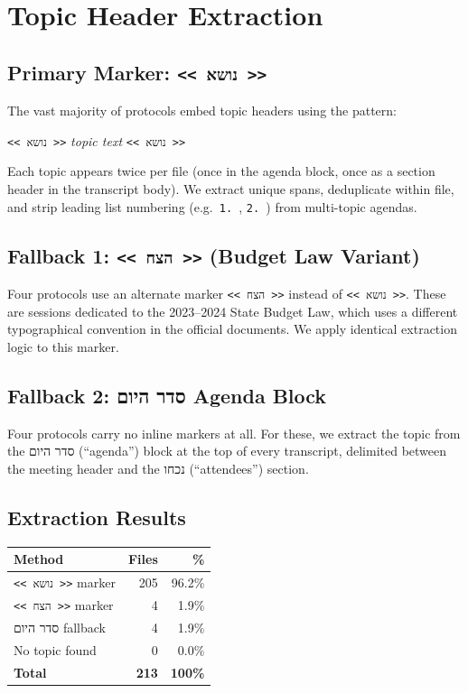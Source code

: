 \documentclass[11pt,a4paper]{article}
\begin{document}
\section{Topic Header Extraction}

\subsection*{Primary Marker: \texttt{<{}< נושא >{}>}}

The vast majority of protocols embed topic headers using the pattern:

\begin{center}
\texttt{<{}< נושא >{}>} \emph{topic text} \texttt{<{}< נושא >{}>}
\end{center}

Each topic appears twice per file (once in the agenda block, once as a section header
in the transcript body). We extract unique spans, deduplicate within file, and strip
leading list numbering (e.g.\ \texttt{1. }, \texttt{2. }) from multi-topic agendas.

\subsection*{Fallback 1: \texttt{<{}< הצח >{}>} (Budget Law Variant)}

Four protocols use an alternate marker \texttt{<{}< הצח >{}>} instead of
\texttt{<{}< נושא >{}>}. These are sessions dedicated to the 2023--2024 State Budget Law,
which uses a different typographical convention in the official documents.
We apply identical extraction logic to this marker.

\subsection*{Fallback 2: \texthebrew{סדר היום} Agenda Block}

Four protocols carry no inline markers at all. For these, we extract the topic from the
\texthebrew{סדר היום} (``agenda'') block at the top of every transcript,
delimited between the meeting header and the \texthebrew{נכחו} (``attendees'') section.

\subsection*{Extraction Results}

\begin{center}
\begin{tabular}{lrr}
\toprule
\textbf{Method} & \textbf{Files} & \textbf{\%} \\
\midrule
\texttt{<{}< נושא >{}>} marker & 205 & 96.2\% \\
\texttt{<{}< הצח >{}>} marker  & 4   & 1.9\%  \\
\texthebrew{סדר היום} fallback & 4   & 1.9\%  \\
No topic found                 & 0   & 0.0\%  \\
\midrule
\textbf{Total}                 & \textbf{213} & \textbf{100\%} \\
\bottomrule
\end{tabular}
\end{center}
\end{document}
